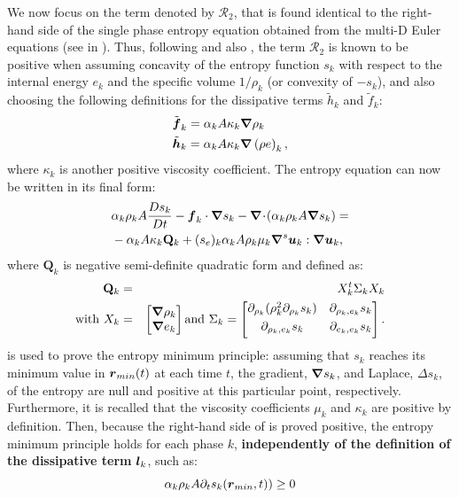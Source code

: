 We now focus on the term denoted by $\mathcal{R}_2$, that is found identical to the right-hand side of the single phase entropy equation obtained from the multi-D Euler equations (see  in ). Thus, following \cite{jlg} and also , the term $\mathcal{R}_2$ is known to be positive when assuming concavity of the entropy function $s_k$ with respect to the internal energy $e_k$ and the specific volume $1 / \rho_k$ (or convexity of $-s_k$), and also choosing the following definitions for the dissipative terms $\tilde{h}_k$ and $\tilde{f}_k$:
%
\begin{align}
&\tilde{\boldsymbol f}_k = \alpha_k A \kappa_k \boldsymbol{\nabla} \rho_k \\
&\tilde{\boldsymbol h}_k = \alpha_k A \kappa_k \boldsymbol{\nabla} \left( \rho e \right)_k,
\end{align}
%  
where $\kappa_k$ is another positive viscosity coefficient. The entropy equation can now be written in its final form:
%
\begin{align}\label{eq:ent-res-7-eqn-diss-terms3}
&\alpha_k \rho_k A \frac{Ds_k}{Dt} - \boldsymbol f_k \cdot \boldsymbol{\nabla} s_k - \boldsymbol{\nabla}\! \cdot \! \left( \alpha_k \rho_k A \boldsymbol{\nabla} s_k \right) = \nonumber\\
&- \alpha_k A \kappa_k \mathbf{Q}_k + (s_e)_k \alpha_k A \rho_k \mu_k \boldsymbol{\nabla}^s \boldsymbol u_k : \boldsymbol{\nabla} \boldsymbol u_k,
\end{align}
%
where $\mathbf{Q}_k$ is negative semi-definite quadratic form and defined as:
%
\begin{eqnarray}
\mathbf{Q}_k &=& X^t_k \Sigma_k X_k \nonumber \\
\text{with } X_k &=& \begin{bmatrix}
\boldsymbol{\nabla} \rho_k \\
\boldsymbol{\nabla} e_k 
\end{bmatrix}
\text{and } \Sigma_k = \begin{bmatrix}
       \partial_{\rho_k} (\rho^2_k \partial_{\rho_k} s_k) & \partial_{\rho_k,e_k} s_k  \\[0.3em]
       \partial_{\rho_k,e_k} s_k & \partial_{e_k,e_k} s_k           \\[0.3em]
     \end{bmatrix}. \nonumber 
\end{eqnarray}
%
 is used to prove the entropy minimum principle: assuming that $s_k$ reaches its minimum value in $\boldsymbol r_{min}(t)$ at each time $t$, the gradient, $\boldsymbol{\nabla} s_k$, and Laplace, $\Delta s_k$,  of the entropy are null and positive at this particular point, respectively. Furthermore, it is recalled that the viscosity coefficients $\mu_k$ and $\kappa_k$ are positive by definition. Then, because the right-hand side of  is proved positive, the entropy minimum principle holds for each phase $k$, \textbf{independently of the definition of the dissipative term} $\boldsymbol l_k$, such as:
%
\begin{equation}\label{eq:ent-res-7-eqn-diss-terms4}
\alpha_k \rho_k A \partial_t s_k(\boldsymbol r_{min},t)) \geq 0 \nonumber
\end{equation}
%

